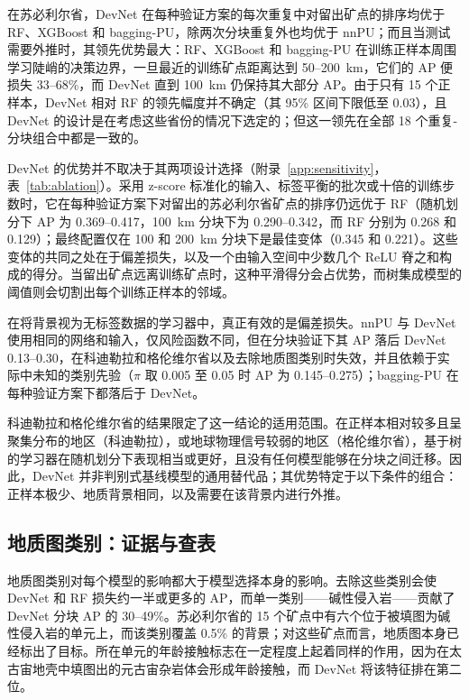 \documentclass[pdflatex,sn-apa]{sn-jnl}
\begin{document}
在苏必利尔省，DevNet 在每种验证方案的每次重复中对留出矿点的排序均优于 RF、XGBoost 和 bagging-PU，除两次分块重复外也均优于 nnPU；而且当测试需要外推时，其领先优势最大：RF、XGBoost 和 bagging-PU 在训练正样本周围学习陡峭的决策边界，一旦最近的训练矿点距离达到 50--200~km，它们的 AP 便损失 33--68\%，而 DevNet 直到 100~km 仍保持其大部分 AP。由于只有 15 个正样本，DevNet 相对 RF 的领先幅度并不确定（其 95\% 区间下限低至 0.03），且 DevNet 的设计是在考虑这些省份的情况下选定的；但这一领先在全部 18 个重复-分块组合中都是一致的。

DevNet 的优势并不取决于其两项设计选择（附录~\ref{app:sensitivity}，表~\ref{tab:ablation}）。采用 z-score 标准化的输入、标签平衡的批次或十倍的训练步数时，它在每种验证方案下对留出的苏必利尔省矿点的排序仍远优于 RF（随机划分下 AP 为 0.369--0.417，100~km 分块下为 0.290--0.342，而 RF 分别为 0.268 和 0.129）；最终配置仅在 100 和 200~km 分块下是最佳变体（0.345 和 0.221）。这些变体的共同之处在于偏差损失，以及一个由输入空间中少数几个 ReLU 脊之和构成的得分。当留出矿点远离训练矿点时，这种平滑得分会占优势，而树集成模型的阈值则会切割出每个训练正样本的邻域。

在将背景视为无标签数据的学习器中，真正有效的是偏差损失。nnPU 与 DevNet 使用相同的网络和输入，仅风险函数不同，但在分块验证下其 AP 落后 DevNet 0.13--0.30，在科迪勒拉和格伦维尔省以及去除地质图类别时失效，并且依赖于实际中未知的类别先验（$\pi$ 取 0.005 至 0.05 时 AP 为 0.145--0.275）；bagging-PU 在每种验证方案下都落后于 DevNet。

科迪勒拉和格伦维尔省的结果限定了这一结论的适用范围。在正样本相对较多且呈聚集分布的地区（科迪勒拉），或地球物理信号较弱的地区（格伦维尔省），基于树的学习器在随机划分下表现相当或更好，且没有任何模型能够在分块之间迁移。因此，DevNet 并非判别式基线模型的通用替代品；其优势特定于以下条件的组合：正样本极少、地质背景相同，以及需要在该背景内进行外推。

\subsection{地质图类别：证据与查表}\label{sec:disc-mapclasses}

地质图类别对每个模型的影响都大于模型选择本身的影响。去除这些类别会使 DevNet 和 RF 损失约一半或更多的 AP，而单一类别——碱性侵入岩——贡献了 DevNet 分块 AP 的 30--49\%。苏必利尔省的 15 个矿点中有六个位于被填图为碱性侵入岩的单元上，而该类别覆盖 0.5\% 的背景；对这些矿点而言，地质图本身已经标出了目标。所在单元的年龄接触标志在一定程度上起着同样的作用，因为在太古宙地壳中填图出的元古宙杂岩体会形成年龄接触，而 DevNet 将该特征排在第二位。
\end{document}
